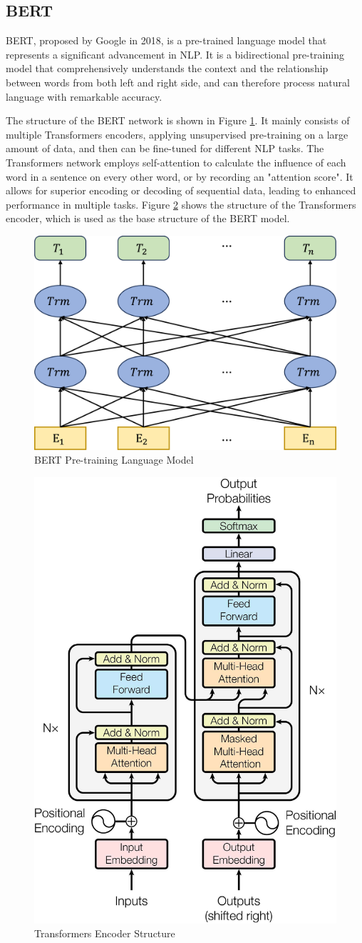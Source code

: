 \documentclass[ %
                    author={Bocheng Wang},
                supervisor={Dr. Qiang Liu},
                    degree={MSc},
                     title={A Research on Identification of Suicide Ideation in Texts with Multiple Models},
                      type={},
                      year={2024}]{dissertation}
\begin{document}
\subsection{BERT}
\noindent
BERT, proposed by Google in 2018\cite{devlin2018bert}, is a pre-trained language model that represents a significant advancement in NLP. It is a bidirectional pre-training model that comprehensively understands the context and the relationship between words from both left and right side, and can therefore process natural language with remarkable accuracy.

The structure of the BERT network is shown in Figure \ref{fig:bertstructure}. It mainly consists of multiple Transformers encoders, applying unsupervised pre-training on a large amount of data, and then can be fine-tuned for different NLP tasks. The Transformers network employs self-attention to calculate the influence of each word in a sentence on every other word, or by recording an "attention score". It allows for superior encoding or decoding of sequential data, leading to enhanced performance in multiple tasks. Figure \ref{fig:transformerstructure} shows the structure of the Transformers encoder, which is used as the base structure of the BERT model.

\begin{figure}[h]
      \centering
      \includegraphics[width=0.45\linewidth]{../img/bert.eps}
      \caption[BERT Pre-training Language Model Diagram]{BERT Pre-training Language Model\cite{devlin2018bert}}
      \label{fig:bertstructure}
\end{figure}

\begin{figure}[h]
      \centering
      \includegraphics[width=0.22\linewidth]{../img/transformer.jpg}
      \caption[Transformers Encoder Structure]{Transformers Encoder Structure\cite{vaswani2017attention}}
      \label{fig:transformerstructure}
\end{figure}
\end{document}
